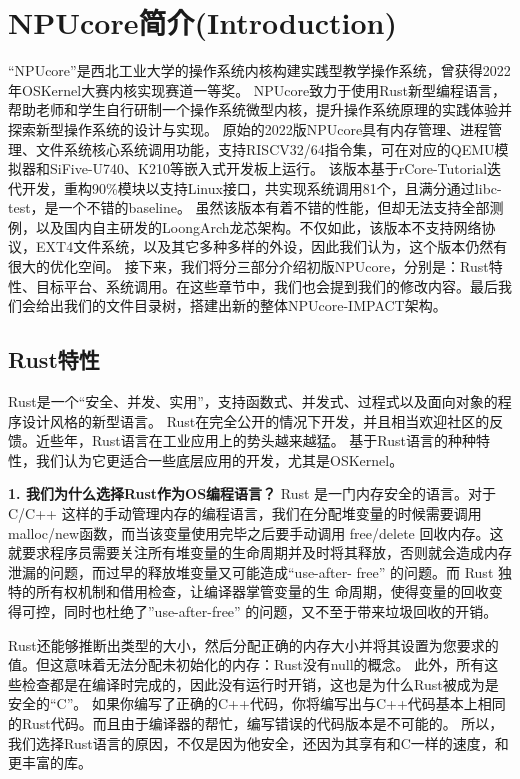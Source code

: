 \chapter{NPUcore简介(Introduction)}

“NPUcore”是西北工业大学的操作系统内核构建实践型教学操作系统，曾获得2022年OSKernel大赛内核实现赛道一等奖。
NPUcore致力于使用Rust新型编程语言，帮助老师和学生自行研制一个操作系统微型内核，提升操作系统原理的实践体验并探索新型操作系统的设计与实现。
原始的2022版NPUcore具有内存管理、进程管理、文件系统核心系统调用功能，支持RISCV32/64指令集，可在对应的QEMU模拟器和SiFive-U740、K210等嵌入式开发板上运行。
该版本基于rCore-Tutorial迭代开发，重构90\%模块以支持Linux接口，共实现系统调用81个，且满分通过libc-test，是一个不错的baseline。
虽然该版本有着不错的性能，但却无法支持全部测例，以及国内自主研发的LoongArch龙芯架构。不仅如此，该版本不支持网络协议，EXT4文件系统，以及其它多种多样的外设，因此我们认为，这个版本仍然有很大的优化空间。
接下来，我们将分三部分介绍初版NPUcore，分别是：Rust特性、目标平台、系统调用。在这些章节中，我们也会提到我们的修改内容。最后我们会给出我们的文件目录树，搭建出新的整体NPUcore-IMPACT架构。

\section{Rust特性}

Rust是一个“安全、并发、实用”，支持函数式、并发式、过程式以及面向对象的程序设计风格的新型语言。
Rust在完全公开的情况下开发，并且相当欢迎社区的反馈。近些年，Rust语言在工业应用上的势头越来越猛。
基于Rust语言的种种特性，我们认为它更适合一些底层应用的开发，尤其是OSKernel。

\textbf{1. 我们为什么选择Rust作为OS编程语言？}
Rust 是一门内存安全的语言。对于 C/C++ 这样的手动管理内存的编程语言，我们在分配堆变量的时候需要调用 malloc/new函数，而当该变量使用完毕之后要手动调用
free/delete 回收内存。这就要求程序员需要关注所有堆变量的生命周期并及时将其释放，否则就会造成内存泄漏的问题，而过早的释放堆变量又可能造成“use-after-
free” 的问题。而 Rust 独特的所有权机制和借用检查，让编译器掌管变量的生
命周期，使得变量的回收变得可控，同时也杜绝了”use-after-free” 的问题，又不至于带来垃圾回收的开销。

Rust还能够推断出类型的大小，然后分配正确的内存大小并将其设置为您要求的值。但这意味着无法分配未初始化的内存：Rust没有null的概念。 
此外，所有这些检查都是在编译时完成的，因此没有运行时开销，这也是为什么Rust被成为是安全的“C”。 
如果你编写了正确的C++代码，你将编写出与C++代码基本上相同的Rust代码。而且由于编译器的帮忙，编写错误的代码版本是不可能的。
所以，我们选择Rust语言的原因，不仅是因为他安全，还因为其享有和C一样的速度，和更丰富的库。


